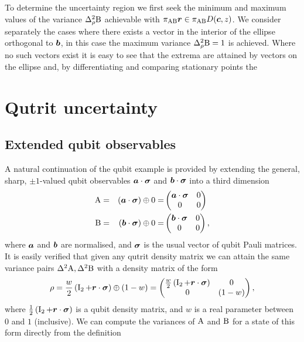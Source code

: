 To determine the uncertainty region we first seek the minimum and maximum values of the variance $\varr{\opb}$ achievable with $\pi_{{\operatorname{A}}{\operatorname{B}}}\bm{r}\in \pi_{{\operatorname{A}}{\operatorname{B}}}D(\bm{c},z)$. We consider separately the cases where there exists a vector in the interior of the ellipse orthogonal to $\bm{b}$, in this case the maximum variance $\varr{\opb} = 1$ is achieved. Where no such vectors exist it is easy to see that the extrema are attained by vectors on the ellipse and, by differentiating and comparing stationary points the 

\section{Qutrit uncertainty}
\label{sec:qutrit}
\subsection{Extended qubit observables}
\label{sec:qubit-extended-uncertainty}
A natural continuation of the qubit example is provided by extending the general, sharp, $\pm 1$-valued qubit observables $\bm{a}\cdot{\boldsymbol\sigma}$ and $\bm{b}\cdot{\boldsymbol\sigma}$ into a third dimension
\begin{alignat}{3}
  \label{eqn:extended-qubit-obs-defn}
  \operatorname{A} &= &(\bm{a}\cdot{\boldsymbol\sigma}) \oplus 0 = &\begin{pmatrix}\bm{a}\cdot{\boldsymbol\sigma} & 0\\ 0 &0\\\end{pmatrix}\\
  \operatorname{B} &= &(\bm{b}\cdot{\boldsymbol\sigma}) \oplus 0 = &\begin{pmatrix}\bm{b}\cdot{\boldsymbol\sigma} & 0\\ 0 &0\\\end{pmatrix},
\end{alignat}
where $\bm{a}$ and $\bm{b}$ are normalised, and ${\boldsymbol\sigma}$ is the usual vector of qubit Pauli matrices. It is easily verified that given any qutrit density matrix we can attain the same variance pairs $\var{\opa}, \var{\opb}$ with a density matrix of the form
\begin{align}
  \rho =\frac{w}{2}\left(\operatorname{I}_2 + \bm{r}\cdot{\boldsymbol\sigma}\right) \oplus (1-w)=\begin{pmatrix}\frac{w}{2}\left(\operatorname{I}_2 + \bm{r}\cdot{\boldsymbol\sigma}\right) & 0 \\ 0& (1-w)\end{pmatrix},
\end{align}
where $\frac{1}{2}\left(\operatorname{I}_2 + \bm{r}\cdot{\boldsymbol\sigma}\right)$ is a qubit density matrix, and $w$ is a real parameter between $0$ and $1$ (inclusive). We can compute the variances of $\operatorname{A}$ and $\operatorname{B}$ for a state of this form directly from the definition

